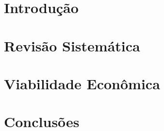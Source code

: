 \vspace{6cm}

\chapter{Introdução} 


\chapter{Revisão Sistemática}


\vspace{6cm}
\chapter{Viabilidade Econômica}


\vspace{6cm}
\chapter{Conclusões}

